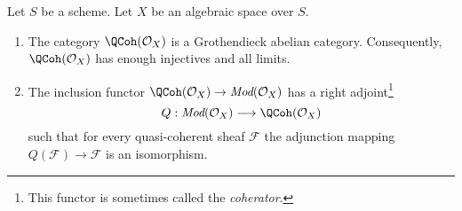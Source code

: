 \begin{proposition}
\label{proposition-coherator}
Let $S$ be a scheme. Let $X$ be an algebraic space over $S$.
\begin{enumerate}
\item The category $\QCoh(\mathcal{O}_X)$ is a Grothendieck
abelian category. Consequently, $\QCoh(\mathcal{O}_X)$
has enough injectives and all limits.
\item The inclusion functor
$\QCoh(\mathcal{O}_X) \to \textit{Mod}(\mathcal{O}_X)$
has a right adjoint\footnote{This functor is sometimes called
the {\it coherator}.}
$$
Q : \textit{Mod}(\mathcal{O}_X) \longrightarrow \QCoh(\mathcal{O}_X)
$$
such that for every quasi-coherent sheaf $\mathcal{F}$ the adjunction mapping
$Q(\mathcal{F}) \to \mathcal{F}$ is an isomorphism.
\end{enumerate}
\end{proposition}

